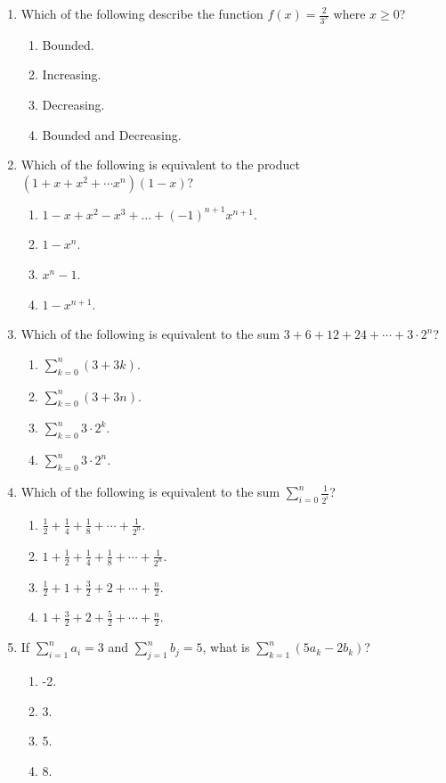 \documentclass{article}
\begin{document}
\begin{enumerate}
  
  \item Which of the following describe the function $f(x)=\frac{2}{3^x}$ where $x\geq 0$?
  \begin{enumerate}
    \item Bounded. 
    \item Increasing. 
    \item Decreasing.
    \item Bounded and Decreasing. %
  \end{enumerate}
  
  \item Which of the following is equivalent to the product $(1+x+x^2+\cdots x^n)(1-x)$?
  \begin{enumerate}
    \item $1-x+x^2-x^3+\dots+(-1)^{n+1}x^{n+1}$. 
    \item $1-x^n$. 
    \item $x^n-1$.
    \item $1-x^{n+1}$. %
  \end{enumerate}
  
  
  \item Which of the following is equivalent to the sum $3+6+12+24+\cdots+3\cdot 2^n$?
  \begin{enumerate}
    \item $\sum_{k=0}^n (3+3k)$. 
    \item $\sum_{k=0}^n (3+3n)$. 
    \item $\sum_{k=0}^n 3\cdot2^k$. %
    \item $\sum_{k=0}^n 3\cdot2^n$.
  \end{enumerate}
  
  
  \item Which of the following is equivalent to the sum $\sum_{i=0}^n\frac{1}{2^i}$?
  \begin{enumerate}
    \item $\frac{1}{2}+\frac{1}{4}+\frac{1}{8}+\cdots+\frac{1}{2^n}$. 
    \item $1+\frac{1}{2}+\frac{1}{4}+\frac{1}{8}+\cdots+\frac{1}{2^n}$. %
    \item $\frac{1}{2}+1+\frac{3}{2}+2+\cdots+\frac{n}{2}$.
    \item $1+\frac{3}{2}+2+\frac{5}{2}+\cdots+\frac{n}{2}$.
  \end{enumerate}
  
  
  \item If $\sum_{i=1}^n a_i=3$ and $\sum_{j=1}^n b_j=5$, what is $\sum_{k=1}^n (5a_k-2b_k)$?
  \begin{enumerate}
    \item -2. 
    \item 3.
    \item 5. %
    \item 8.
  \end{enumerate}

  
  
  
    
\end{enumerate}
\end{document}
